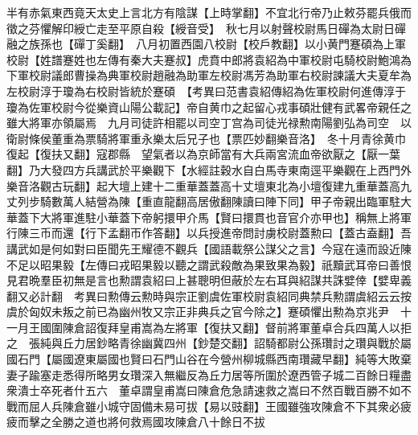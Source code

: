 半有赤氣東西竟天太史上言北方有陰謀【上時掌翻】不宜北行帝乃止敕芬罷兵俄而徵之芬懼解印綬亡走至平原自殺【綬音受】　秋七月以射聲校尉馬日磾為太尉日磾融之族孫也【磾丁奚翻】　八月初置西園八校尉【校戶教翻】以小黄門蹇碩為上軍校尉【姓譜蹇姓也左傳有秦大夫蹇叔】虎賁中郎將袁紹為中軍校尉屯騎校尉鮑鴻為下軍校尉議郎曹操為典軍校尉趙融為助軍左校尉馮芳為助軍右校尉諫議大夫夏牟為左校尉淳于瓊為右校尉皆統於蹇碩　【考異曰范書袁紹傳紹為佐軍校尉何進傳淳于瓊為佐軍校尉今從樂資山陽公載記】帝自黄巾之起留心戎事碩壯健有武畧帝親任之雖大將軍亦領屬焉　九月司徒許相罷以司空丁宫為司徒光禄勲南陽劉弘為司空　以衛尉條侯董重為票騎將軍重永樂太后兄子也【票匹妙翻樂音洛】　冬十月青徐黄巾復起【復扶又翻】寇郡縣　望氣者以為京師當有大兵兩宮流血帝欲厭之【厭一葉翻】乃大發四方兵講武於平樂觀下【水經註穀水自白馬寺東南逕平樂觀在上西門外樂音洛觀古玩翻】起大壇上建十二重華蓋蓋高十丈壇東北為小壇復建九重華蓋高九丈列步騎數萬人結營為陳【重直龍翻高居傲翻陳讀曰陣下同】甲子帝親出臨軍駐大華蓋下大將軍進駐小華蓋下帝躬擐甲介馬【賢曰擐貫也音官介亦甲也】稱無上將軍行陳三币而還【行下孟翻帀作答翻】以兵授進帝問討虜校尉蓋勲曰【蓋古盍翻】吾講武如是何如對曰臣聞先王耀德不觀兵【國語載祭公謀父之言】今寇在遠而設近陳不足以昭果毅【左傳曰戎昭果毅以聽之謂武殺敵為果致果為毅】祇黷武耳帝曰善恨見君晩羣臣初無是言也勲謂袁紹曰上甚聰明但蔽於左右耳與紹謀共誅嬖倖【嬖卑義翻又必計翻　考異曰勲傳云勲時與宗正劉虞佐軍校尉袁紹同典禁兵勲謂虞紹云云按虞於匈奴未叛之前已為幽州牧又宗正非典兵之官今除之】蹇碩懼出勲為京兆尹　十一月王國圍陳倉詔復拜皇甫嵩為左將軍【復扶又翻】督前將軍董卓合兵四萬人以拒之　張純與丘力居鈔略青徐幽冀四州【鈔楚交翻】詔騎都尉公孫瓚討之瓚與戰於屬國石門【屬國遼東屬國也賢曰石門山谷在今營州柳城縣西南瓚藏早翻】純等大敗棄妻子踰塞走悉得所略男女瓚深入無繼反為丘力居等所圍於遼西管子城二百餘日糧盡衆潰士卒死者什五六　董卓謂皇甫嵩曰陳倉危急請速救之嵩曰不然百戰百勝不如不戰而屈人兵陳倉雖小城守固備未易可拔【易以豉翻】王國雖強攻陳倉不下其衆必疲疲而擊之全勝之道也將何救焉國攻陳倉八十餘日不拔

